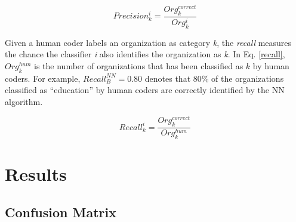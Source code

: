 \documentclass[12pt]{article}
\begin{document}
\begin{equation} \label{precision}
    Precision^{i}_{k}=\frac{Org^{correct}_{k}}{Org^{i}_{k}}
\end{equation}

Given a human coder labels an organization as category \textit{k}, the \textit{recall} measures the chance the classifier \textit{i} also identifies the organization as \textit{k}. In Eq. \ref{recall}, $Org^{hum}_{k}$ is the number of organizations that has been classified as $k$ by human coders. For example, $Recall^{NN}_{B}=0.80$ denotes that 80\% of the organizations classified as ``education'' by human coders are correctly identified by the NN algorithm.

\begin{equation} \label{recall}
    Recall^{i}_{k}=\frac{Org^{correct}_{k}}{Org^{hum}_{k}}
\end{equation}


\section{Results}

\subsection{Confusion Matrix}



\singlespacing
\sloppy
\printbibliography
\end{document}
